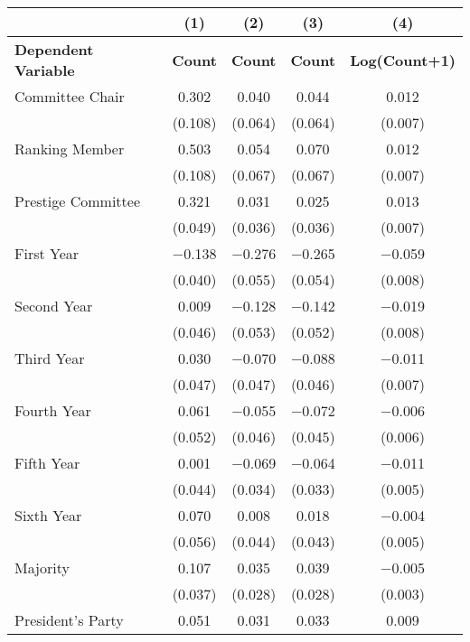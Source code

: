 \begin{tabular}[t]{lcccc}
\toprule
  & (1) & (2) & (3) & (4)\\
\midrule
\textbf{Dependent Variable} & \textbf{Count} & \textbf{Count} & \textbf{Count} & \textbf{Log(Count+1)}\\
\midrule
Committee Chair & \num{0.302} & \num{0.040} & \num{0.044} & \num{0.012}\\
 & (\num{0.108}) & (\num{0.064}) & (\num{0.064}) & (\num{0.007})\\
Ranking Member & \num{0.503} & \num{0.054} & \num{0.070} & \num{0.012}\\
 & (\num{0.108}) & (\num{0.067}) & (\num{0.067}) & (\num{0.007})\\
Prestige Committee & \num{0.321} & \num{0.031} & \num{0.025} & \num{0.013}\\
 & (\num{0.049}) & (\num{0.036}) & (\num{0.036}) & (\num{0.007})\\
First Year & \num{-0.138} & \num{-0.276} & \num{-0.265} & \num{-0.059}\\
 & (\num{0.040}) & (\num{0.055}) & (\num{0.054}) & (\num{0.008})\\
Second Year & \num{0.009} & \num{-0.128} & \num{-0.142} & \num{-0.019}\\
 & (\num{0.046}) & (\num{0.053}) & (\num{0.052}) & (\num{0.008})\\
Third Year & \num{0.030} & \num{-0.070} & \num{-0.088} & \num{-0.011}\\
 & (\num{0.047}) & (\num{0.047}) & (\num{0.046}) & (\num{0.007})\\
Fourth Year & \num{0.061} & \num{-0.055} & \num{-0.072} & \num{-0.006}\\
 & (\num{0.052}) & (\num{0.046}) & (\num{0.045}) & (\num{0.006})\\
Fifth Year & \num{0.001} & \num{-0.069} & \num{-0.064} & \num{-0.011}\\
 & (\num{0.044}) & (\num{0.034}) & (\num{0.033}) & (\num{0.005})\\
Sixth Year & \num{0.070} & \num{0.008} & \num{0.018} & \num{-0.004}\\
 & (\num{0.056}) & (\num{0.044}) & (\num{0.043}) & (\num{0.005})\\
Majority & \num{0.107} & \num{0.035} & \num{0.039} & \num{-0.005}\\
 & (\num{0.037}) & (\num{0.028}) & (\num{0.028}) & (\num{0.003})\\
President's Party & \num{0.051} & \num{0.031} & \num{0.033} & \num{0.009}\\

\end{tabular}
